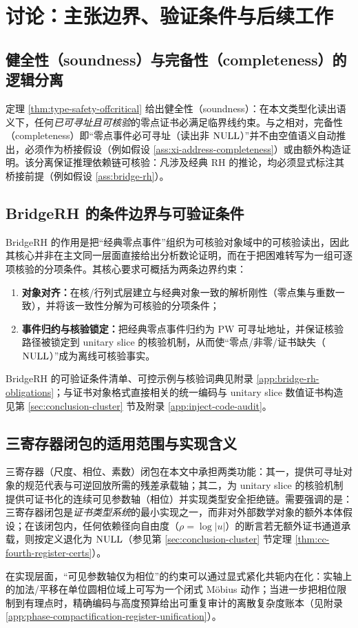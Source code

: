 \section{讨论：主张边界、验证条件与后续工作}

\subsection{健全性（soundness）与完备性（completeness）的逻辑分离}
定理 \ref{thm:type-safety-offcritical} 给出健全性（soundness）：在本文类型化读出语义下，任何\emph{已可寻址且可核验}的零点证书必满足临界线约束。与之相对，完备性（completeness）即“零点事件必可寻址（读出非 $\mathrm{NULL}$）”并不由空值语义自动推出，必须作为桥接假设（例如假设 \ref{ass:xi-address-completeness}）或由额外构造证明。该分离保证推理依赖链可核验：凡涉及经典 RH 的推论，均必须显式标注其桥接前提（例如假设 \ref{ass:bridge-rh}）。

\subsection{BridgeRH 的条件边界与可验证条件}
BridgeRH 的作用是把“经典零点事件”组织为可核验对象域中的可核验读出，因此其核心并非在主文同一层面直接给出分析数论证明，而在于把困难转写为一组可逐项核验的分项条件。其核心要求可概括为两条边界约束：
\begin{enumerate}
  \item \textbf{对象对齐：}在核/行列式层建立与经典对象一致的解析刚性（零点集与重数一致），并将该一致性分解为可核验的分项条件；
  \item \textbf{事件归约与核验锁定：}把经典零点事件归约为 PW 可寻址地址，并保证核验路径被锁定到 unitary slice 的核验机制，从而使“零点/非零/证书缺失（$\mathrm{NULL}$）”成为离线可核验事实。
\end{enumerate}
BridgeRH 的可验证条件清单、可控示例与核验词典见附录 \ref{app:bridge-rh-obligations}；与证书对象格式直接相关的统一编码与 unitary slice 数值证书构造见第 \ref{sec:conclusion-cluster} 节及附录 \ref{app:inject-code-audit}。

\subsection{三寄存器闭包的适用范围与实现含义}
三寄存器（尺度、相位、素数）闭包在本文中承担两类功能：其一，提供可寻址对象的规范代表与可逆回放所需的残差承载轴；其二，为 unitary slice 的核验机制提供可证书化的连续可见参数轴（相位）并实现类型安全拒绝链。需要强调的是：三寄存器闭包是\emph{证书类型系统}的最小实现之一，而非对外部数学对象的额外本体假设；在该闭包内，任何依赖径向自由度（$\rho=\log|u|$）的断言若无额外证书通道承载，则按定义退化为 $\mathrm{NULL}$（参见第 \ref{sec:conclusion-cluster} 节定理 \ref{thm:cc-fourth-register-certs}）。
\par
在实现层面，“可见参数轴仅为相位”的约束可以通过显式紧化共轭内在化：实轴上的加法/平移在单位圆相位域上可写为一个闭式 Möbius 动作；当进一步把相位限制到有理点时，精确编码与高度预算给出可重复审计的离散复杂度账本（见附录 \ref{app:phase-compactification-register-unification}）。

